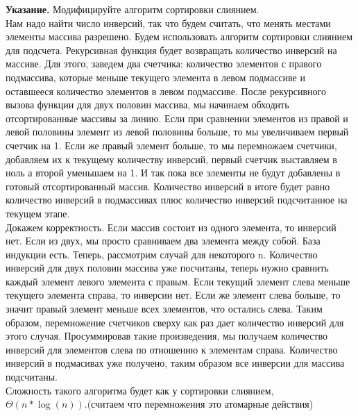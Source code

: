 \documentclass[12pt]{extreport}
\theoremstyle{definiton}
\theoremstyle{definition}
\theoremstyle{definition}
\def\prend{
	\medskip
}
\def\ukaz{\noindent\textbf{Указание.} }
\begin{document}
\ukaz Модифицируйте алгоритм сортировки слиянием. 
\newline
\\ Нам надо найти число инверсий, так что будем считать, что менять местами элементы массива разрешено.
Будем использовать алгоритм сортировки слиянием для подсчета. Рекурсивная функция будет возвращать количество инверсий на массиве. Для этого, заведем два счетчика: количество элементов с правого подмассива, которые меньше текущего элемента в левом подмассиве и оставшееся количество элементов в левом подмассиве. После рекурсивного вызова функции для двух половин массива, мы начинаем обходить отсортированные массивы за линию. Если при сравнении элементов из правой и левой половины элемент из левой половины больше, то мы увеличиваем первый счетчик на 1. Если же правый элемент больше, то мы перемножаем счетчики, добавляем их к текущему количеству инверсий, первый счетчик выставляем в ноль а второй уменьшаем на 1. И так пока все элементы не будут добавлены в готовый отсортированный массив. Количество инверсий в итоге будет равно количество инверсий в подмассивах плюс количество инверсий подсчитанное на текущем этапе.
\\ Докажем корректность. Если массив состоит из одного элемента, то инверсий нет. Если из двух, мы просто сравниваем два элемента между собой. База индукции есть. Теперь, рассмотрим случай для некоторого n. Количество инверсий для двух половин массива уже посчитаны, теперь нужно сравнить каждый элемент левого элемента с правым. Если текущий элемент слева меньше текущего элемента справа, то инверсии нет. Если же элемент слева больше, то значит правый элемент меньше всех элементов, что остались слева. Таким образом, перемножение счетчиков сверху как раз дает количество инверсий для этого случая. Просуммировав такие произведения, мы получаем количество инверсий для элементов слева по отношению к элементам справа. Количество инверсий в подмасивах уже получено, таким образом все инверсии для массива подсчитаны.
\\Сложность такого алгоритма будет как у сортировки слиянием, $\Theta(n*\log(n))$.(считаем что перемножения это атомарные действия)
\prend

\end{document}
